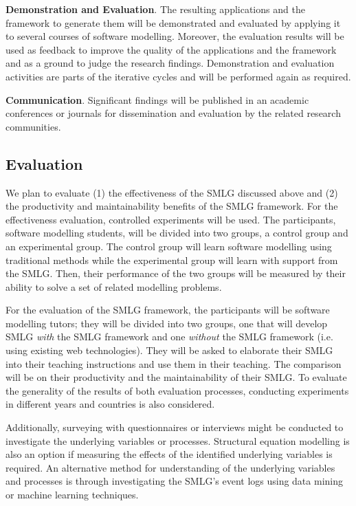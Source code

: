 \documentclass[12pt, a4paper]{report}
\begin{document}
\textbf{Demonstration and Evaluation}. The resulting applications and the
framework to generate them will be demonstrated and evaluated by applying it to
several courses of software modelling. Moreover, the evaluation results will be
used as feedback to improve the quality of the applications and the framework
and as a ground to judge the research findings. Demonstration and evaluation
activities are parts of the iterative cycles and will be performed again as
required.

\textbf{Communication}. Significant findings will be published in an academic conferences or journals for dissemination and evaluation by the related research communities.

\subsection{Evaluation}
We plan to evaluate (1) the effectiveness of the SMLG discussed above and (2) the productivity and maintainability benefits of the SMLG framework. For the effectiveness evaluation, controlled experiments will be used. The participants, software modelling students, will be divided into two groups, a control group and an experimental group. The control group will learn software modelling using traditional methods while the experimental group will learn with support from the SMLG. Then, their performance of the two groups will be measured by their ability to solve a set of related modelling problems. 

For the evaluation of the SMLG framework, the participants will be software modelling tutors; they will be divided into two groups, one that will develop SMLG \emph{with} the SMLG framework and one \emph{without} the SMLG framework (i.e. using existing web technologies). They will be asked to elaborate their SMLG into their teaching instructions and use them in their teaching. The comparison will be on their productivity and the maintainability of their SMLG. To evaluate the generality of the results of both evaluation processes, conducting experiments in different years and countries is also considered.

Additionally, surveying with questionnaires or interviews might be conducted to investigate the underlying variables or processes. Structural equation modelling \cite{hair2016primer} is also an option if measuring the effects of the identified underlying variables is required. An alternative method for understanding of the underlying variables and processes is through investigating the SMLG's event logs using data mining or machine learning techniques.
\end{document}
